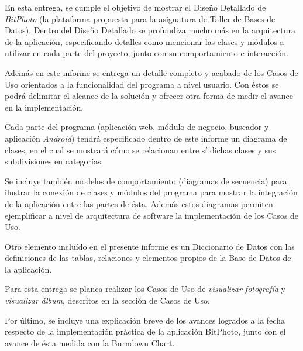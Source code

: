 \documentclass{memoria}
\begin{document}


\indices


En esta entrega, se cumple el objetivo de mostrar el Diseño Detallado de \textsl{BitPhoto} (la plataforma propuesta para la asignatura de Taller de Bases de Datos). Dentro del Diseño Detallado se profundiza mucho más en la arquitectura de la aplicación, especificando detalles como mencionar las clases y módulos a utilizar en cada parte del proyecto, junto con su comportamiento e interacción.

Además en este informe se entrega un detalle completo y acabado de los Casos de Uso orientados a la funcionalidad del programa a nivel usuario. Con éstos se podrá delimitar el alcance de la solución y ofrecer otra forma de medir el avance en la implementación.

Cada parte del programa (aplicación web, módulo de negocio, buscador y aplicación \textsl{Android}) tendrá especificado dentro de este informe un diagrama de clases, en el cual se mostrará cómo se relacionan entre sí dichas clases y sus subdivisiones en categorías.

Se incluye también modelos de comportamiento (diagramas de secuencia) para ilustrar la conexión de clases y módulos del programa para mostrar la integración de la aplicación entre las partes de ésta. Además estos diagramas permiten ejemplificar a nivel de arquitectura de software la implementación de los Casos de Uso.

Otro elemento incluído en el presente informe es un Diccionario de Datos con las definiciones de las tablas, relaciones y elementos propios de la Base de Datos de la aplicación.

Para esta entrega se planea realizar los Casos de Uso de \textsl{visualizar fotografía} y \textsl{visualizar álbum}, descritos en la sección de Casos de Uso.

Por último, se incluye una explicación breve de los avances logrados a la fecha respecto de la implementación práctica de la aplicación BitPhoto, junto con el avance de ésta medida con la Burndown Chart.
\end{document}
